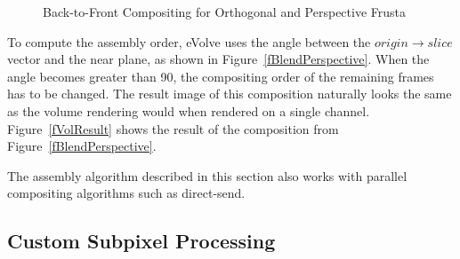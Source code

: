 \documentclass[10pt,a4]{scrartcl}
\newcommand{\fig}[1]{Figure~\ref{#1}}
\begin{document}
\begin{figure}[h!t]
  \hfil
  {\caption{\label{fBlend}Back-to-Front Com\-po\-siting for
      Orthogonal and Perspective Frusta}}
\end{figure}

To compute the assembly order, \textsf{eVolve} uses the angle between
the $origin \rightarrow slice$ vector and the near plane, as shown in
\fig{fBlendPerspective}. When the angle becomes greater than
90\textdegree, the compositing order of the remaining frames has to be
changed. The result image of this composition naturally looks the same
as the volume rendering would when rendered on a single
channel. \fig{fVolResult} shows the result of the composition from
\fig{fBlendPerspective}.

The assembly algorithm described in this section also works with parallel
compositing algorithms such as direct-send. 

\subsection{\label{sFSAA}Custom Subpixel Processing}
\end{document}
